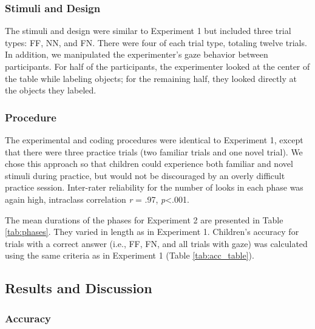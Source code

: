 \documentclass[a4paper,man,apacite,floatsintext]{apa6}
\begin{document}
\subsubsection{Stimuli and Design}\label{stimuli-and-design-1}

The stimuli and design were similar to Experiment 1 but included three
trial types: FF, NN, and FN. There were four of each trial type,
totaling twelve trials. In addition, we manipulated the experimenter's
gaze behavior between participants. For half of the participants, the
experimenter looked at the center of the table while labeling objects;
for the remaining half, they looked directly at the objects they
labeled.

\subsubsection{Procedure}\label{procedure-1}

The experimental and coding procedures were identical to Experiment 1,
except that there were three practice trials (two familiar trials and
one novel trial). We chose this approach so that children could
experience both familiar and novel stimuli during practice, but would
not be discouraged by an overly difficult practice session. Inter-rater
reliability for the number of looks in each phase was again high,
intraclass correlation \emph{r} = .97, \emph{p}\textless{}.001.

The mean durations of the phases for Experiment 2 are presented in Table
\ref{tab:phases}. They varied in length as in Experiment 1. Children's
accuracy for trials with a correct answer (i.e., FF, FN, and all trials
with gaze) was calculated using the same criteria as in Experiment 1
(Table \ref {tab:acc_table}).

\subsection{Results and Discussion}\label{results-and-discussion-1}

\subsubsection{Accuracy}\label{accuracy-1}
\end{document}
